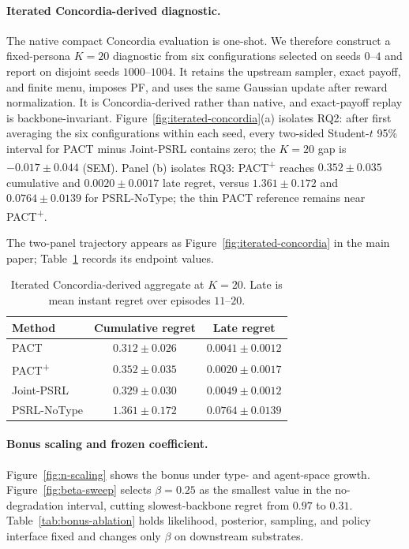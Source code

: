 \paragraph{Iterated Concordia-derived diagnostic.}
The native compact Concordia evaluation is one-shot. We therefore construct a fixed-persona $K{=}20$ diagnostic from six configurations selected on seeds $0$--$4$ and report on disjoint seeds $1000$--$1004$. It retains the upstream sampler, exact payoff, and finite menu, imposes PF, and uses the same Gaussian update after reward normalization. It is Concordia-derived rather than native, and exact-payoff replay is backbone-invariant. Figure~\ref{fig:iterated-concordia}(a) isolates RQ2: after first averaging the six configurations within each seed, every two-sided Student-$t$ 95\% interval for PACT minus Joint-PSRL contains zero; the $K=20$ gap is $-0.017\pm0.044$ (SEM). Panel (b) isolates RQ3: PACT\textsuperscript{+} reaches $0.352\pm0.035$ cumulative and $0.0020\pm0.0017$ late regret, versus $1.361\pm0.172$ and $0.0764\pm0.0139$ for PSRL-NoType; the thin PACT reference remains near PACT\textsuperscript{+}.

The two-panel trajectory appears as Figure~\ref{fig:iterated-concordia} in the main paper; Table~\ref{tab:iterated-concordia} records its endpoint values.

\begin{table}[t]
\centering\small
\caption{Iterated Concordia-derived aggregate at $K{=}20$. Late is mean instant regret over episodes $11$--$20$.}
\label{tab:iterated-concordia}
\begin{tabular}{lcc}
\toprule
Method & Cumulative regret & Late regret \\
\midrule
PACT & $0.312\pm0.026$ & $0.0041\pm0.0012$ \\
PACT\textsuperscript{+} & $0.352\pm0.035$ & $0.0020\pm0.0017$ \\
Joint-PSRL & $0.329\pm0.030$ & $0.0049\pm0.0012$ \\
PSRL-NoType & $1.361\pm0.172$ & $0.0764\pm0.0139$ \\
\bottomrule
\end{tabular}
\end{table}

\paragraph{Bonus scaling and frozen coefficient.}
Figure~\ref{fig:n-scaling} shows the bonus under type- and agent-space growth. Figure~\ref{fig:beta-sweep} selects $\beta=0.25$ as the smallest value in the no-degradation interval, cutting slowest-backbone regret from $0.97$ to $0.31$. Table~\ref{tab:bonus-ablation} holds likelihood, posterior, sampling, and policy interface fixed and changes only $\beta$ on downstream substrates.

